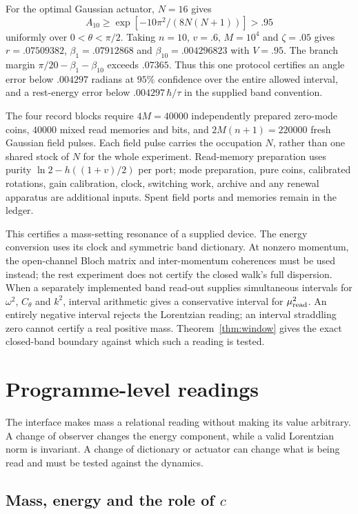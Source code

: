 \documentclass[12pt,a4paper]{article}
\theoremstyle{definition}
\theoremstyle{remark}
\begin{document}
For the optimal Gaussian actuator, $N=16$ gives
\[
 A_{10}\ge \exp[-10\pi^2/(8N(N+1))]>.95
\]
uniformly over $0<\theta<\pi/2$. Taking $n=10$, $v=.6$, $M=10^4$ and $\zeta=.05$ gives $r=.07509382$, $\beta_1=.07912868$ and $\beta_{10}=.004296823$ with $V=.95$. The branch margin $\pi/20-\beta_1-\beta_{10}$ exceeds $.07365$. Thus this one protocol certifies an angle error below $.004297$ radians at $95\%$ confidence over the entire allowed interval, and a rest-energy error below $.004297\,\hbar/\tau$ in the supplied band convention.

The four record blocks require $4M=40000$ independently prepared zero-mode coins, $40000$ mixed read memories and bits, and $2M(n+1)=220000$ fresh Gaussian field pulses. Each field pulse carries the occupation $N$, rather than one shared stock of $N$ for the whole experiment. Read-memory preparation uses purity $\ln2-h((1+v)/2)$ per port; mode preparation, pure coins, calibrated rotations, gain calibration, clock, switching work, archive and any renewal apparatus are additional inputs. Spent field ports and memories remain in the ledger.

This certifies a mass-setting resonance of a supplied device. The energy conversion uses its clock and symmetric band dictionary. At nonzero momentum, the open-channel Bloch matrix and inter-momentum coherences must be used instead; the rest experiment does not certify the closed walk's full dispersion. When a separately implemented band read-out supplies simultaneous intervals for $\omega^2$, $C_\theta$ and $k^2$, interval arithmetic gives a conservative interval for $\mu_{\rm read}^2$. An entirely negative interval rejects the Lorentzian reading; an interval straddling zero cannot certify a real positive mass. Theorem~\ref{thm:window} gives the exact closed-band boundary against which such a reading is tested.

\section{Programme-level readings}
\label{sec:readings}

The interface makes mass a relational reading without making its value arbitrary. A change of observer changes the energy component, while a valid Lorentzian norm is invariant. A change of dictionary or actuator can change what is being read and must be tested against the dynamics.

\subsection{Mass, energy and the role of \texorpdfstring{$c$}{c}}
\label{sec:c2}
\end{document}
